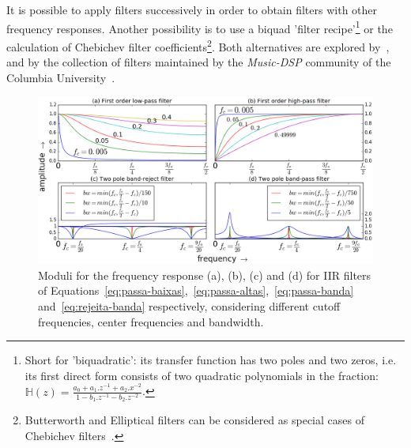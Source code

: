 It is possible to apply filters successively in order to obtain filters with other frequency responses. Another possibility is to use a biquad 'filter recipe'\footnote{Short for 'biquadratic': its transfer function has two poles and two zeros, i.e. its first direct form consists of two quadratic polynomials in the fraction: $\mathbb{H}(z)=\frac{a_0+a_1.z^{-1}+a_2.x^{-2}}{1- b_1.z^{-1} -b_2 . z^{-2}}$.} or the calculation of Chebichev filter coefficients\footnote{Butterworth and Elliptical filters can be considered as special cases of Chebichev filters~\cite{Openheim,smith}.}.
Both alternatives are explored by~\cite{JOSFM,smith}, and by the collection of filters maintained by the \emph{Music-DSP} community of the Columbia University~\cite{music-dsp,Openheim}.

\begin{figure}
    \centering
        \includegraphics[width=\textwidth]{figures/iir__}
    \caption{Moduli for the frequency response (a), (b), (c) and (d) for IIR filters of Equations~\ref{eq:passa-baixas},~\ref{eq:passa-altas},~\ref{eq:passa-banda} and~\ref{eq:rejeita-banda} respectively, considering different cutoff frequencies, center frequencies and bandwidth.}
        \label{fig:iir}
\end{figure}

